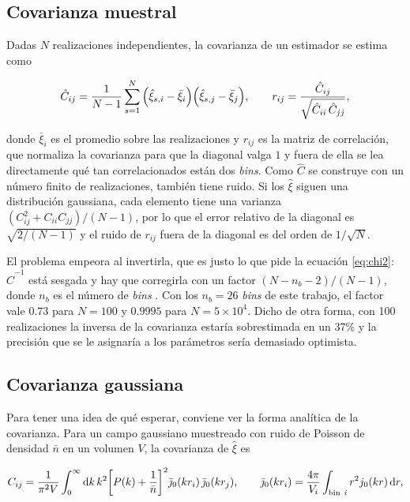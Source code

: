 \documentclass[letterpaper, 12pt]{article}
\begin{document}
        \subsection{Covarianza muestral}

            Dadas $N$ realizaciones independientes, la covarianza de un estimador se estima como

            \begin{equation}\label{eq:cov_muestral}
                \hat C_{ij} = \frac{1}{N-1}\sum_{s=1}^{N} \qty(\hat\xi_{s,i} - \bar\xi_i)\qty(\hat\xi_{s,j} - \bar\xi_j), \qquad
                r_{ij} = \frac{\hat C_{ij}}{\sqrt{\hat C_{ii}\,\hat C_{jj}}},
            \end{equation}

            donde $\bar\xi_i$ es el promedio sobre las realizaciones y $r_{ij}$ es la matriz de correlación, que normaliza la covarianza para que la diagonal valga $1$ y fuera de ella se lea directamente qué tan correlacionados están dos \emph{bins}. Como $\hat C$ se construye con un número finito de realizaciones, también tiene ruido. Si los $\hat\xi$ siguen una distribución gaussiana, cada elemento tiene una varianza $(C_{ij}^2 + C_{ii}C_{jj})/(N-1)$, por lo que el error relativo de la diagonal es $\sqrt{2/(N-1)}$ y el ruido de $r_{ij}$ fuera de la diagonal es del orden de $1/\sqrt N$.

            El problema empeora al invertirla, que es justo lo que pide la ecuación \eqref{eq:chi2}: $\hat C^{-1}$ está sesgada y hay que corregirla con un factor $(N - n_b - 2)/(N-1)$, donde $n_b$ es el número de \emph{bins} \cite{hartlap}. Con los $n_b = 26$ \emph{bins} de este trabajo, el factor vale $0.73$ para $N = 100$ y $0.9995$ para $N = 5\times10^4$. Dicho de otra forma, con 100 realizaciones la inversa de la covarianza estaría sobrestimada en un 37\% y la precisión que se le asignaría a los parámetros sería demasiado optimista.

        \subsection{Covarianza gaussiana}

            Para tener una idea de qué esperar, conviene ver la forma analítica de la covarianza. Para un campo gaussiano muestreado con ruido de Poisson de densidad $\bar n$ en un volumen $V$, la covarianza de $\hat\xi$ es \cite{grieb, wang_cov}

            \begin{equation}\label{eq:cov_gauss}
                C_{ij} = \frac{1}{\pi^2 V}\int_0^\infty \dd k\, k^2 \qty[P(k) + \frac{1}{\bar n}]^2 \bar\jmath_0(kr_i)\,\bar\jmath_0(kr_j), \qquad
                \bar\jmath_0(kr_i) = \frac{4\pi}{V_i}\int_{\rm bin\ \it i} r^2 j_0(kr)\,\dd r,
            \end{equation}
\end{document}
